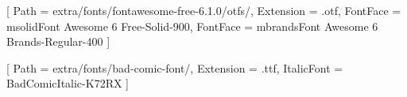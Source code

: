 

\newfontfamily{}[
    Path = {extra/fonts/fontawesome-free-6.1.0/otfs/}, Extension = {.otf},
    FontFace = {m}{solid}{Font Awesome 6 Free-Solid-900},
    FontFace = {m}{brands}{Font Awesome 6 Brands-Regular-400}
]

\newfontfamily{}[
    Path = {extra/fonts/bad-comic-font/}, Extension = {.ttf},
    ItalicFont = {BadComicItalic-K72RX}
]

